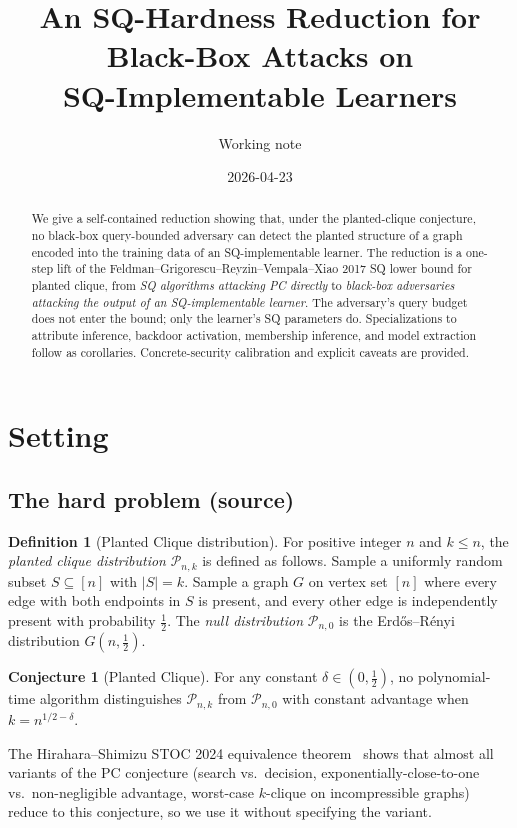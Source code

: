 \documentclass[11pt,a4paper]{article}
\title{An SQ-Hardness Reduction for Black-Box Attacks on \\ SQ-Implementable Learners}
\author{Working note}
\date{2026-04-23}
\theoremstyle{definition}
\newtheorem{definition}[theorem]{Definition}
\newtheorem{conjecture}[theorem]{Conjecture}
\theoremstyle{remark}
\newcommand{\Pnk}{\mathcal{P}_{n,k}}
\newcommand{\Pnzero}{\mathcal{P}_{n,0}}
\begin{document}
\maketitle

\begin{abstract}
We give a self-contained reduction showing that, under the planted-clique conjecture, no black-box query-bounded adversary can detect the planted structure of a graph encoded into the training data of an SQ-implementable learner. The reduction is a one-step lift of the Feldman--Grigorescu--Reyzin--Vempala--Xiao 2017 SQ lower bound for planted clique, from \emph{SQ algorithms attacking PC directly} to \emph{black-box adversaries attacking the output of an SQ-implementable learner}. The adversary's query budget does not enter the bound; only the learner's SQ parameters do. Specializations to attribute inference, backdoor activation, membership inference, and model extraction follow as corollaries. Concrete-security calibration and explicit caveats are provided.
\end{abstract}

\section{Setting}

\subsection{The hard problem (source)}

\begin{definition}[Planted Clique distribution]
For positive integer $n$ and $k \le n$, the \emph{planted clique distribution} $\Pnk$ is defined as follows. Sample a uniformly random subset $S \subseteq [n]$ with $|S| = k$. Sample a graph $G$ on vertex set $[n]$ where every edge with both endpoints in $S$ is present, and every other edge is independently present with probability $\tfrac{1}{2}$. The \emph{null distribution} $\Pnzero$ is the Erd\H{o}s--R\'enyi distribution $G(n, \tfrac{1}{2})$.
\end{definition}

\begin{conjecture}[Planted Clique]
For any constant $\delta \in (0, \tfrac{1}{2})$, no polynomial-time algorithm distinguishes $\Pnk$ from $\Pnzero$ with constant advantage when $k = n^{1/2 - \delta}$.
\end{conjecture}

The Hirahara--Shimizu STOC 2024 equivalence theorem~\cite{HS24} shows that almost all variants of the PC conjecture (search vs.\ decision, exponentially-close-to-one vs.\ non-negligible advantage, worst-case $k$-clique on incompressible graphs) reduce to this conjecture, so we use it without specifying the variant.
\end{document}
